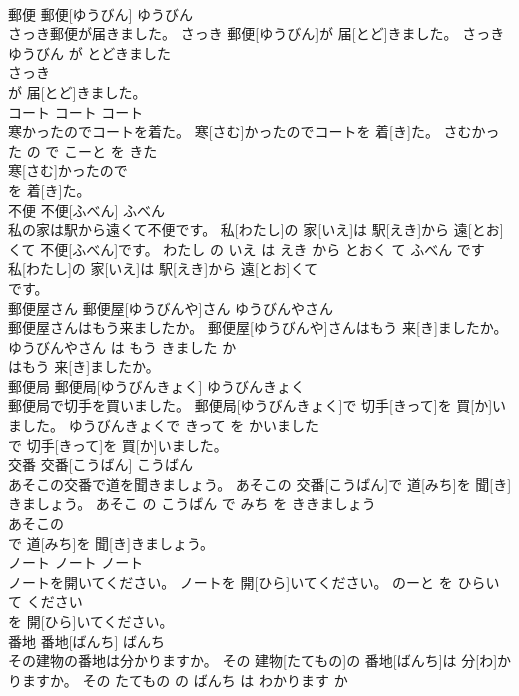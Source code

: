 \documentclass[8pt]{extreport}
\begin{document}
\begin{CJK}{UTF8}{min}
\\	郵便	郵便[ゆうびん]	ゆうびん	
\\	さっき郵便が届きました。	さっき 郵便[ゆうびん]が 届[とど]きました。	さっき ゆうびん が とどきました	
\\	さっき
\\	が 届[とど]きました。			
\\	コート	コート	コート	
\\	寒かったのでコートを着た。	寒[さむ]かったのでコートを 着[き]た。	さむかった の で こーと を きた	
\\	寒[さむ]かったので
\\	を 着[き]た。			
\\	不便	不便[ふべん]	ふべん	
\\	私の家は駅から遠くて不便です。	私[わたし]の 家[いえ]は 駅[えき]から 遠[とお]くて 不便[ふべん]です。	わたし の いえ は えき から とおく て ふべん です	
\\	私[わたし]の 家[いえ]は 駅[えき]から 遠[とお]くて
\\	です。			
\\	郵便屋さん	郵便屋[ゆうびんや]さん	ゆうびんやさん	
\\	郵便屋さんはもう来ましたか。	郵便屋[ゆうびんや]さんはもう 来[き]ましたか。	ゆうびんやさん は もう きました か	
\\	はもう 来[き]ましたか。			
\\	郵便局	郵便局[ゆうびんきょく]	ゆうびんきょく	
\\	郵便局で切手を買いました。	郵便局[ゆうびんきょく]で 切手[きって]を 買[か]いました。	ゆうびんきょくで きって を かいました	
\\	で 切手[きって]を 買[か]いました。			
\\	交番	交番[こうばん]	こうばん	
\\	あそこの交番で道を聞きましょう。	あそこの 交番[こうばん]で 道[みち]を 聞[き]きましょう。	あそこ の こうばん で みち を ききましょう	
\\	あそこの
\\	で 道[みち]を 聞[き]きましょう。			
\\	ノート	ノート	ノート	
\\	ノートを開いてください。	ノートを 開[ひら]いてください。	のーと を ひらいて ください	
\\	を 開[ひら]いてください。			
\\	番地	番地[ばんち]	ばんち	
\\	その建物の番地は分かりますか。	その 建物[たてもの]の 番地[ばんち]は 分[わ]かりますか。	その たてもの の ばんち は わかります か	

\end{CJK}
\end{document}
